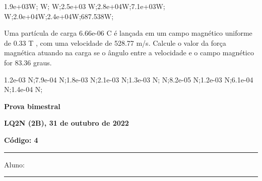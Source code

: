 \documentclass[12pt, addpoints]{exam}
\begin{document}
\begin{questions}
\begin{multicols*}{2}
\begin{oneparchoices}
\choice 1.9e+03W; W; W;\choice 2.5e+03 W;\choice 2.8e+04W;\choice 7.1e+03W; W;\choice 2.0e+04W;\choice 2.4e+04W;\choice 687.538W;\end{oneparchoices}
\question[20] Uma partícula de carga 6.66e-06 C é lançada em um campo magnético uniforme de    0.33 T , com uma velocidade de 528.77 m/s. Calcule o valor da força magnética atuando na carga se o ângulo entre a velocidade e o campo magnético for   83.36 graus.

\begin{oneparchoices}
\choice 1.2e-03 N;\choice 7.9e-04 N;\choice 1.8e-03 N;\choice 2.1e-03 N;\choice 1.3e-03 N; N;\choice 8.2e-05 N;\choice 1.2e-03 N;\choice 6.1e-04 N;\choice 1.4e-04 N;\end{oneparchoices}
\end{multicols*}
\end{questions}
\newpage
        \begin{minipage}[b]{0.75\linewidth}
            \begin{flushleft}
                {\bf \large Prova bimestral}
            \end{flushleft}
            \begin{flushleft}
                {\bf \large LQ2N (2B), 31 de outubro de 2022}
            \end{flushleft}
        \end{minipage}
        \begin{minipage}[b]{0.20\linewidth}
            \begin{flushright}
                {\bf \large Código: 4}
            \end{flushright}
        \end{minipage}
        \vspace{0.5cm} \hrule \vspace{0.5cm}
        \begin{minipage}{0.75\linewidth}
            Aluno:
        \end{minipage}
        \vspace{0.5cm} \hrule \vspace{0.5cm}
\end{document}
